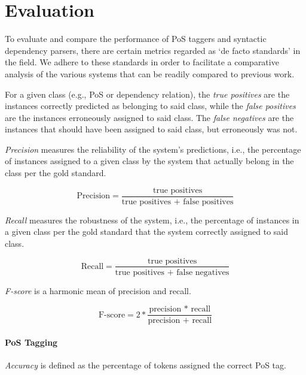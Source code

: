 \documentclass[a4paper,12pt,english]{book}
\begin{document}
\section{Evaluation}
To evaluate and compare the performance of PoS taggers and syntactic dependency
parsers, there are certain metrics regarded as `de facto standards' in the
field. We adhere to these standards in order to facilitate a comparative
analysis of the various systems that can be readily compared to previous work.

For a given class (e.g., PoS or dependency relation), the \emph{true positives}
are the instances correctly predicted as belonging to said class, while the
\emph{false positives} are the instances erroneously assigned to said class. The
\emph{false negatives} are the instances that should have been assigned to said
class, but erroneously was not.

\emph{Precision} measures the reliability of the system's predictions, i.e.,
the percentage of instances assigned to a given class by the system that
actually belong in the class per the gold standard.

\begin{equation*}
    \text{Precision} = \frac{\text{true positives}}{\text{true positives +
            false positives}}
\end{equation*}

\vspace{1ex}

\emph{Recall} measures the robustness of the system, i.e., the percentage of
instances in a given class per the gold standard that the system correctly
assigned to said class.

\begin{equation*}
    \text{Recall} = \frac{\text{true positives}}{\text{true positives + false
            negatives}}
\end{equation*}

\vspace{1ex}

\emph{F-score} is a harmonic mean of precision and recall.

\begin{equation*}
    \text{F-score} = 2*\frac{\text{precision * recall}}{\text{precision + recall}}
\end{equation*}

\paragraph{PoS Tagging}
\emph{Accuracy} is defined as the percentage of tokens assigned the correct PoS
tag.
\end{document}
